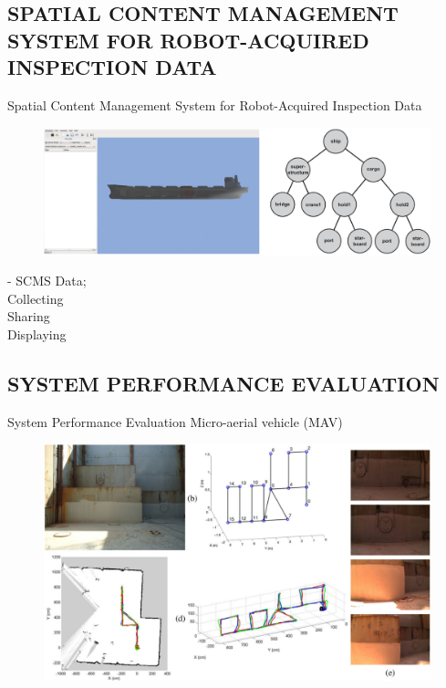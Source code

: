 \documentclass{beamer}
\begin{document}
        \subsection{SPATIAL CONTENT MANAGEMENT SYSTEM FOR ROBOT-ACQUIRED INSPECTION DATA}

            \begin{frame}{Spatial Content Management System for Robot-Acquired Inspection Data}
                \begin{figure}[htb]
                    \hfill \includegraphics[scale=0.15]{figuras/the_spatial_content_management_system.png}                   
                    \label{}
                \end{figure}                 
                - SCMS Data; \\
                Collecting \\
                Sharing \\
                Displaying

            \end{frame}

        \subsection{SYSTEM PERFORMANCE EVALUATION}

            \begin{frame}{System Performance Evaluation}
                Micro-aerial vehicle (MAV) 
                \begin{figure}[htb]
                    \centering
                    \includegraphics[scale=0.18]{figuras/MAV_results_in_autonomous_moode_from_the_second_field_trial.png}                   
                    \label{}
                \end{figure} 
            \end{frame}
\end{document}
